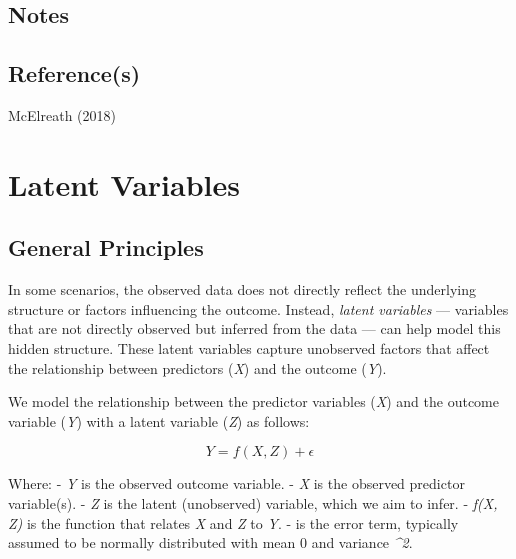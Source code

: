 \documentclass[
  letterpaper,
  DIV=11,
  numbers=noendperiod]{scrreprt}
\begin{document}
\section{Notes}\label{notes-8}

\begin{tcolorbox}[enhanced jigsaw, toptitle=1mm, opacityback=0, titlerule=0mm, breakable, bottomrule=.15mm, colframe=quarto-callout-note-color-frame, arc=.35mm, coltitle=black, left=2mm, opacitybacktitle=0.6, leftrule=.75mm, toprule=.15mm, rightrule=.15mm, bottomtitle=1mm, colbacktitle=quarto-callout-note-color!10!white, title=\textcolor{quarto-callout-note-color}{\faInfo}\hspace{0.5em}{Note}, colback=white]

\end{tcolorbox}

\section{Reference(s)}\label{references-15}

McElreath (2018)


\chapter{Latent Variables}\label{latent-variables}

\section{General Principles}\label{general-principles-16}

In some scenarios, the observed data does not directly reflect the
underlying structure or factors influencing the outcome. Instead,
\emph{latent variables} --- variables that are not directly observed but
inferred from the data --- can help model this hidden structure. These
latent variables capture unobserved factors that affect the relationship
between predictors (\emph{X}) and the outcome (\emph{Y}).

We model the relationship between the predictor variables (\emph{X}) and
the outcome variable (\emph{Y}) with a latent variable (\emph{Z}) as
follows:

\[
Y = f(X, Z) + \epsilon
\]

Where: - \emph{Y} is the observed outcome variable. - \emph{X} is the
observed predictor variable(s). - \emph{Z} is the latent (unobserved)
variable, which we aim to infer. - \emph{f(X, Z)} is the function that
relates \emph{X} and \emph{Z} to \emph{Y}. - \emph{\epsilon} is the
error term, typically assumed to be normally distributed with mean 0 and
variance \emph{\sigma\^{}2}.
\end{document}
